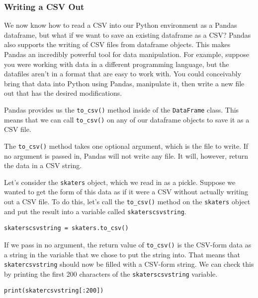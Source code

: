 \subsubsection{Writing a CSV Out}
We now know how to read a CSV into our Python environment as a Pandas dataframe, but what if we want to save an existing dataframe as a CSV? Pandas also supports the writing of CSV files from dataframe objects. This makes Pandas an incredibly powerful tool for data manipulation. For example, suppose you were working with data in a different programming language, but the datafiles aren't in a format that are easy to work with. You could conceivably bring that data into Python using Pandas, manipulate it, then write a new file out that has the desired modifications.\par
Pandas provides us the \verb|to_csv()| method inside of the \verb|DataFrame| class. This means that we can call \verb|to_csv()| on any of our dataframe objects to save it as a CSV file.\par
{}
The \verb|to_csv()| method takes one optional argument, which is the file to write. If no argument is passed in, Pandas will not write any file. It will, however, return the data in a CSV string.\par
Let's consider the \verb|skaters| object, which we read in as a pickle. Suppose we wanted to get the form of this data as if it were a CSV without actually writing out a CSV file. To do this, let's call the \verb|to_csv()| method on the \verb|skaters| object and put the result into a variable called \verb|skaterscsvstring|.\par
\begin{lstlisting}[style=pippython]
skaterscsvstring = skaters.to_csv()
\end{lstlisting}
If we pass in no argument, the return value of \verb|to_csv()| is the CSV-form data as a string in the variable that we chose to put the string into. That means that \verb|skatercsvstring| should now be filled with a CSV-form string. We can check this by printing the first 200 characters of the \verb|skaterscsvstring| variable.\par
\begin{lstlisting}[style=pippython]
print(skatercsvstring[:200])
\end{lstlisting}
